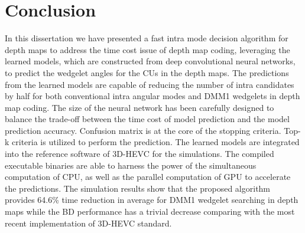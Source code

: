 \chapter{Conclusion}\label{ch:chapter6} %
%
%
In this dissertation we have presented a fast
intra mode decision algorithm for depth maps to
address the time cost issue of depth map coding, leveraging 
the learned models, which are constructed from deep
convolutional neural networks, to predict the wedgelet angles
for the CUs in the depth maps.
The predictions from the learned models are capable of
reducing the number of intra candidates by half for both
conventional intra angular modes and DMM1 wedgelets in depth map coding.
The size of the neural network has been carefully designed to balance
the trade-off between the time cost of model prediction and the model prediction
accuracy.
Confusion matrix is at the core of the stopping criteria.
Top-k criteria is utilized to perform the prediction.
The learned models are integrated into the reference software of
3D-HEVC for the simulations.
The compiled executable binaries are able to harness
the power of the simultaneous computation of CPU, as well as
the parallel computation of GPU to accelerate the 
predictions.
The simulation results show that the proposed algorithm
provides 64.6\% time reduction in average 
for DMM1 wedgelet searching
in depth maps while the
BD performance has a trivial decrease comparing 
with the most recent implementation of 3D-HEVC
standard.
